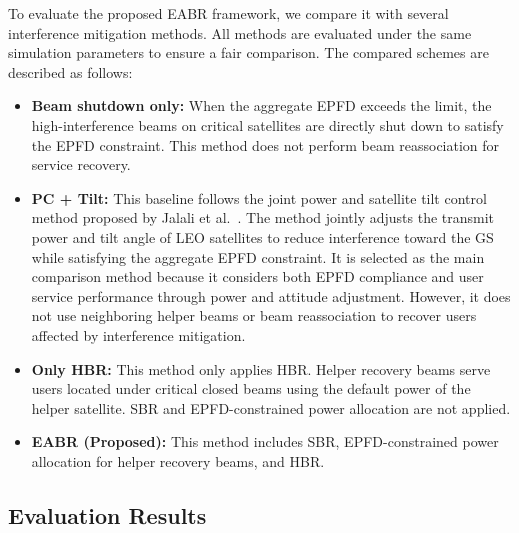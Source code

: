 To evaluate the proposed EABR framework, we compare it with several interference mitigation methods. All methods are evaluated under the same simulation parameters to ensure a fair comparison. The compared schemes are described as follows:
\begin{itemize}[leftmargin=*,nosep]
  \item \textbf{Beam shutdown only:}
  When the aggregate EPFD exceeds the limit, the high-interference beams on critical satellites are directly shut down to satisfy the EPFD constraint. This method does not perform beam reassociation for service recovery.
  \item \textbf{PC + Tilt:}
  This baseline follows the joint power and satellite tilt control method proposed by Jalali et al.~\cite{jalali2023joint}. The method jointly adjusts the transmit power and tilt angle of LEO satellites to reduce interference toward the GS while satisfying the aggregate EPFD constraint. It is selected as the main comparison method because it considers both EPFD compliance and user service performance through power and attitude adjustment. However, it does not use neighboring helper beams or beam reassociation to recover users affected by interference mitigation.
  \item \textbf{Only HBR:}
  This method only applies HBR. Helper recovery beams serve users located under critical closed beams using the default power of the helper satellite. SBR and EPFD-constrained power allocation are not applied.
  \item \textbf{EABR (Proposed):}
  This method includes SBR, EPFD-constrained power allocation for helper recovery beams, and HBR.
\end{itemize}

\subsection{Evaluation Results}
\label{sec:eval_results}


